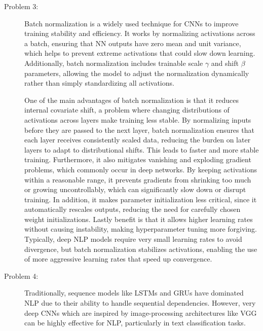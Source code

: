 \documentclass[10pt]{article}
\begin{document}
\begin{description}
\begin{enumerate}
\end{enumerate}

\pagebreak

\item[Problem 3:]  \hfill %

Batch normalization is a widely used technique for CNNs to improve training stability and efficiency.
It works by normalizing activations across a batch, ensuring that NN outputs have zero mean and unit variance, 
which helps to prevent extreme activations that could slow down learning. 
Additionally, batch normalization includes trainable scale $\gamma$ and shift $\beta$  parameters, 
allowing the model to adjust the normalization dynamically rather than simply standardizing all activations.

One of the main advantages of batch normalization is that it reduces internal covariate shift, 
a problem where changing distributions of activations across layers make training less stable. 
By normalizing inputs before they are passed to the next layer, batch normalization ensures that each layer receives consistently scaled data, 
reducing the burden on later layers to adapt to distributional shifts. This leads to faster and more stable training.
Furthermore, it also mitigates vanishing and exploding gradient problems, which commonly occur in deep networks. 
By keeping activations within a reasonable range, it prevents gradients from shrinking too much or growing uncontrollably, 
which can significantly slow down or disrupt training. In addition, it makes parameter initialization less critical, 
since it automatically rescales outputs, reducing the need for carefully chosen weight initializations.
Lastly benefit is that it allows higher learning rates without causing instability, making hyperparameter tuning more forgiving. 
Typically, deep NLP models require very small learning rates to avoid divergence, but batch normalization stabilizes activations, 
enabling the use of more aggressive learning rates that speed up convergence.

\pagebreak

\item[Problem 4:]  \hfill %

Traditionally, sequence models like LSTMs and GRUs have dominated NLP due to their ability to handle sequential dependencies. 
However, very deep CNNs which are inspired by image-processing architectures like VGG can be highly effective for NLP, 
particularly in text classification tasks.


\end{description}
\end{document}

